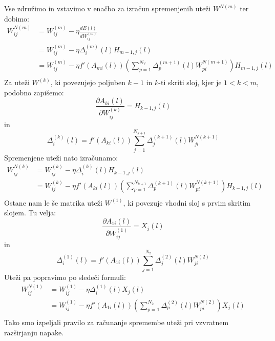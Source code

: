 \documentclass[mat1]{fmfdelo}
\begin{document}
%
Vse združimo in vstavimo v enačbo za izračun spremenjenih uteži $W^{N(m)}$ ter dobimo:
%
\begin{equation}
\begin{aligned}
W^{N(m)}_{ij} &= W^{(m)}_{ij} - \eta\frac{dE(l)}{dW_{ij}^{(m)}} \\
&= W ^{(m)}_{ij} -\eta  \Delta^{(m)}_i (l)H_{m-1,j}(l)\\
&= W ^{(m)}_{ij} -\eta f'(A_{mi}(l))  \left(\sum^{N_Y}_{p=1} \Delta ^{(m+1)}_p(l)W^{N (m+1)}_{pi}\right)H_{m-1,j}(l)\\
\end{aligned}
\end{equation}
%
Za uteži $W^{(k)}$, ki povezujejo poljuben $k-1$ in $k$-ti skriti sloj, kjer je $1 < k < m$, podobno zapišemo:
%
\begin{equation*}
\frac{\partial A_{ki}(l)}{\partial W^{(k)}_{ij}} = H_{k-1,j}(l)
\end{equation*}
%
in 
%
\begin{equation*}
\Delta^{(k)}_i(l) =  f'(A_{ki}(l))  \sum^{N_{k+1}}_{j=1} \Delta ^{(k+1)}_j(l)W^{N (k+1)}_{ji}
\end{equation*}
%
Spremenjene uteži nato izračunamo:
%
\begin{equation}
\begin{aligned}
W^{N(k)}_{ij}&= W ^{(k)}_{ij} -\eta  \Delta^{(k)}_i (l)H_{k-1,j}(l)\\
&= W ^{(k)}_{ij} -\eta f'(A_{ki}(l))  \left(\sum^{N_{k+1}}_{p=1} \Delta ^{(k+1)}_p(l)W^{N (k+1)}_{pi}\right)H_{k-1,j}(l)\\
\end{aligned}
\end{equation}
%
Ostane nam le še matrika uteži $W^{(1)}$, ki povezuje vhodni sloj s prvim skritim slojem. Tu velja:
%
\begin{equation*}
\frac{\partial A_{1i}(l)}{\partial W^{(1)}_{ij}} = X_j(l)
\end{equation*}
%
in 
%
\begin{equation*}
\Delta^{(1)}_i(l) =  f'(A_{1i}(l))  \sum^{N_{2}}_{j=1} \Delta ^{(2)}_j(l)W^{N (2)}_{ji}
\end{equation*}
%
Uteži pa popravimo po sledeči formuli:
%
\begin{equation}
\begin{aligned}
W^{N(1)}_{ij}&= W ^{(1)}_{ij} -\eta  \Delta^{(1)}_i (l)X_j(l)\\
&= W ^{(1)}_{ij} -\eta f'(A_{1i}(l))  \left(\sum^{N_{2}}_{p=1} \Delta ^{(2)}_p(l)W^{N (2)}_{pi}\right)X_j(l)\\
\end{aligned}
\end{equation}
%
%
Tako smo izpeljali pravilo za računanje spremembe uteži pri vzvratnem razširjanju napake.
%
\end{document}
